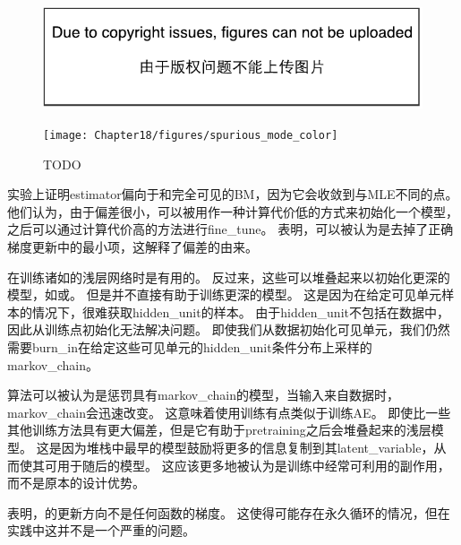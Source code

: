 \begin{figure}[!htb]
\ifOpenSource
\centerline{\includegraphics{figure.pdf}}
\else
\centerline{\texttt{[image: Chapter18/figures/spurious\_mode\_color]}}
\fi
\caption{TODO}
\label{fig:chap18_spurious_mode}
\end{figure}


\cite{Perpinan+Hinton-2005-small}实验上证明\gls{estimator}偏向于和完全可见的\gls{BM}，因为它会收敛到与\gls{MLE}不同的点。
他们认为，由于偏差很小，可以被用作一种计算代价低的方式来初始化一个模型，之后可以通过计算代价高的方法进行\gls{fine_tune}。
\cite{Bengio+Delalleau-2009}表明，可以被认为是去掉了正确梯度更新中的最小项，这解释了偏差的由来。


在训练诸如的浅层网络时是有用的。
反过来，这些可以堆叠起来以初始化更深的模型，如或。
但是并不直接有助于训练更深的模型。
这是因为在给定可见单元样本的情况下，很难获取\gls{hidden_unit}的样本。
由于\gls{hidden_unit}不包括在数据中，因此从训练点初始化无法解决问题。
即使我们从数据初始化可见单元，我们仍然需要\gls{burn_in}在给定这些可见单元的\gls{hidden_unit}条件分布上采样的\gls{markov_chain}。


算法可以被认为是惩罚具有\gls{markov_chain}的模型，当输入来自数据时，\gls{markov_chain}会迅速改变。
这意味着使用训练有点类似于训练\gls{AE}。
即使比一些其他训练方法具有更大偏差，但是它有助于\gls{pretraining}之后会堆叠起来的浅层模型。
这是因为堆栈中最早的模型鼓励将更多的信息复制到其\gls{latent_variable}，从而使其可用于随后的模型。
这应该更多地被认为是训练中经常可利用的副作用，而不是原本的设计优势。


\cite{sutskever2010convergence-small}表明，的更新方向不是任何函数的梯度。
这使得可能存在永久循环的情况，但在实践中这并不是一个严重的问题。


